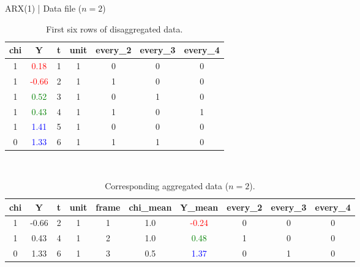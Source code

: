 \documentclass[aspectratio=169, xcolor=dvipsnames]{beamer} %
\begin{document}
\begin{frame}{ARX(1) | Data file ($n = 2$)}
    \footnotesize
    \begin{table}[]
        \centering
        \begin{tabular}{ccccccc}
            \toprule
            chi & Y & t & unit & every\_2 & every\_3 & every\_4 \\
            \midrule
            1 & \textcolor{red}{0.18} & 1 & 1 & 0 & 0 & 0 \\
            1 & \textcolor{red}{-0.66} & 2 & 1 & 1 & 0 & 0 \\
            1 & \textcolor{green}{0.52} & 3 & 1 & 0 & 1 & 0 \\
            1 & \textcolor{green}{0.43} & 4 & 1 & 1 & 0 & 1 \\
            1 & \textcolor{blue}{1.41} & 5 & 1 & 0 & 0 & 0 \\
            0 & \textcolor{blue}{1.33} & 6 & 1 & 1 & 1 & 0 \\
            \bottomrule
        \end{tabular}
        \caption{First six rows of disaggregated data.}
    \end{table} \\
    \bigskip
    \begin{table}[ht]
        \centering
        \begin{tabularx}{.9\linewidth}{cccccccccc}
            \toprule
            chi & Y & t & unit & frame & chi\_mean & Y\_mean & every\_2 & every\_3 & every\_4 \\
            \midrule
            1 & -0.66 & 2 & 1 & 1 & 1.0 & \textcolor{red}{-0.24} & 0 & 0 & 0 \\
            1 & 0.43 & 4 & 1 & 2 & 1.0 & \textcolor{green}{0.48} & 1 & 0 & 0 \\
            0 & 1.33 & 6 & 1 & 3 & 0.5 & \textcolor{blue}{1.37} & 0 & 1 & 0 \\
            \bottomrule
        \end{tabularx}
        \caption{Corresponding aggregated data ($n = 2$).}
    \end{table}
\end{frame}

\end{document}
